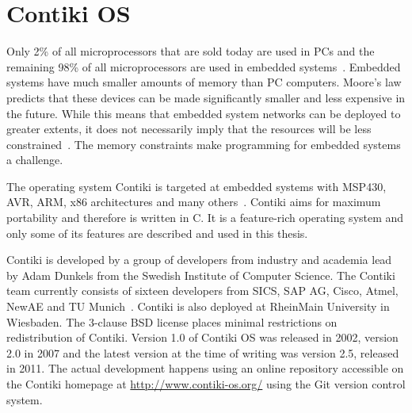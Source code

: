 
\chapter{Contiki OS}
Only 2\% of all microprocessors that are sold today are used in PCs and the remaining 98\%
of all microprocessors are used in embedded systems~\cite{thesis-programming}.
Embedded systems have much smaller amounts of memory than PC computers.
Moore's law predicts that these devices
can be made significantly smaller and less expensive in the future.
While this means that embedded system networks can
be deployed to greater extents, it does not necessarily imply
that the resources will be less constrained~\cite{paper-contiki}.
The memory constraints make programming for embedded systems a challenge.

The operating system Contiki is targeted at embedded systems with MSP430, AVR, ARM, x86
architectures and many others~\cite{contiki-docs}.
Contiki aims for maximum portability and therefore is written in C.
It is a feature-rich operating system and
only some of its features are described and used in this thesis.

Contiki is developed by a group of developers from industry and academia
lead by Adam Dunkels from the Swedish Institute of Computer Science.
The Contiki team currently consists of sixteen developers from SICS,
SAP AG, Cisco, Atmel, NewAE and TU Munich~\cite{contiki-docs}.
Contiki is also deployed at RheinMain University in Wiesbaden.
The 3-clause BSD license places minimal restrictions on redistribution of Contiki.
Version 1.0 of Contiki OS was released in 2002, version 2.0 in 2007 and the latest version
at the time of writing was version 2.5, released in 2011.
The actual development happens using an online repository accessible on the Contiki homepage at \url{http://www.contiki-os.org/}
using the Git version control system.










